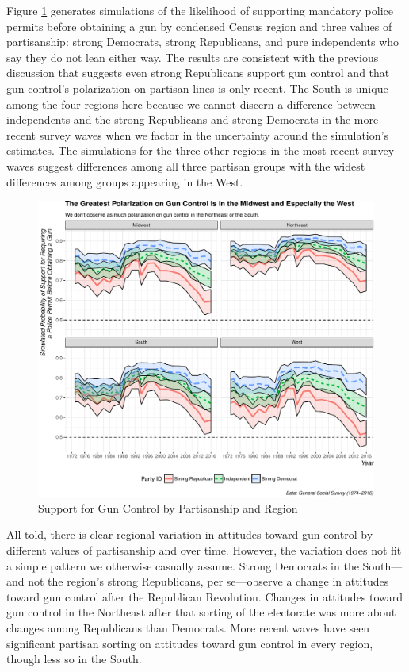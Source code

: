 \documentclass[11pt,]{article}
\makeatletter
\def\maxwidth{\ifdim\Gin@nat@width>\linewidth\linewidth
\else\Gin@nat@width\fi}
\let\Oldincludegraphics\includegraphics
\renewcommand{\includegraphics}[1]{\Oldincludegraphics[width=\maxwidth]{#1}}
\makeatother
\begin{document}
Figure \ref{fig:simyearregion} generates simulations of the likelihood
of supporting mandatory police permits before obtaining a gun by
condensed Census region and three values of partisanship: strong
Democrats, strong Republicans, and pure independents who say they do not
lean either way. The results are consistent with the previous discussion
that suggests even strong Republicans support gun control and that gun
control's polarization on partisan lines is only recent. The South is
unique among the four regions here because we cannot discern a
difference between independents and the strong Republicans and strong
Democrats in the more recent survey waves when we factor in the
uncertainty around the simulation's estimates. The simulations for the
three other regions in the most recent survey waves suggest differences
among all three partisan groups with the widest differences among groups
appearing in the West.

\begin{figure}[htbp]
\centering
\includegraphics{gss-guns_files/figure-latex/simyearregion-1.pdf}
\caption{\label{fig:simyearregion} Support for Gun Control by
Partisanship and Region}
\end{figure}

All told, there is clear regional variation in attitudes toward gun
control by different values of partisanship and over time. However, the
variation does not fit a simple pattern we otherwise casually assume.
Strong Democrats in the South---and not the region's strong Republicans,
per se---observe a change in attitudes toward gun control after the
Republican Revolution. Changes in attitudes toward gun control in the
Northeast after that sorting of the electorate was more about changes
among Republicans than Democrats. More recent waves have seen
significant partisan sorting on attitudes toward gun control in every
region, though less so in the South.
\end{document}
